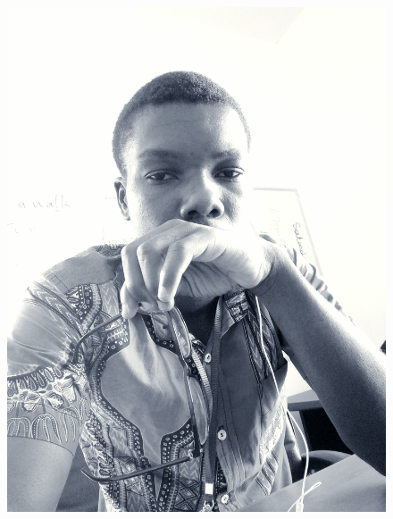 \documentclass[11pt, a4paper]{awesome-cv} %
\begin{document}
\makecvheader %

\begin{figure}[!h]
\centering
\includegraphics[scale=0.02]{pp.jpg}
\end{figure}








%
%
%
%
%

\end{document}
